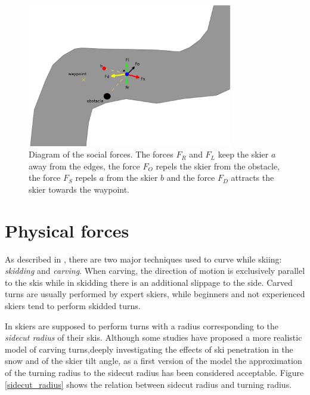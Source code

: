 \documentclass[12pt,a4paper,twoside]{book}
\begin{document}
\begin{figure}[!ht]
  \begin{center}
    \includegraphics[width=0.8\textwidth]{images/social_forces_dia.eps}
    \caption{Diagram of the social forces. The forces $F_R$ and $F_L$ keep the skier $a$ away from the edges, the force $F_O$ repels the skier from the obstacle, the force $F_S$ repels $a$ from the skier $b$ and the force $F_D$ attracts the skier towards the waypoint.}\label{social_forces_diagram}
  \end{center}
\end{figure}


\section{Physical forces}
As described in \cite{hol2012}, there are two major techniques used to curve while skiing: \textit{skidding} and \textit{carving}. When carving, the direction of motion is exclusively parallel to the skis while in skidding there is an additional slippage to the side. Carved turns are usually performed by expert skiers, while beginners and not experienced skiers tend to perform skidded turns.

In \cite{hol2012} skiers are supposed to perform turns with a radius corresponding to the \textit{sidecut radius} of their skis. Although some studies \cite{jen2004} \cite{fe2010} have proposed a more realistic model of carving turns,deeply investigating the effects of ski penetration  in the snow and of the skier tilt angle, as a first version of the model the approximation of the turning radius to the sidecut radius has been considered acceptable. Figure \ref{sidecut_radius} shows the relation between sidecut radius and turning radius.
\end{document}
